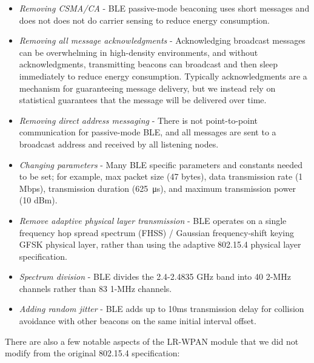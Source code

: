 \begin{itemize}

\item \textit{Removing CSMA/CA} - BLE passive-mode beaconing uses short
messages and does not does not do carrier sensing to reduce energy consumption. 

\item \textit{Removing all message acknowledgments} - Acknowledging broadcast
messages can be overwhelming in high-density environments, and without
acknowledgments, transmitting beacons can broadcast and then sleep immediately
to reduce energy consumption. Typically acknowledgments are a mechanism for
guaranteeing message delivery, but we instead rely on statistical guarantees
that the message will be delivered over time.

\item \textit{Removing direct address messaging} - There is not point-to-point
communication for passive-mode BLE, and all messages are sent to a broadcast
address and received by all listening nodes. 

\item \textit{Changing parameters} - Many BLE specific parameters and constants
needed to be set; for example, max packet size (47 bytes), data transmission
rate (1 Mbps), transmission duration (\SI{625}{\micro\second}), and maximum
transmission power (10 dBm). 

\item \textit{Remove adaptive physical layer transmission} - BLE operates on a
single frequency hop spread spectrum (FHSS) / Gaussian frequency-shift keying
GFSK physical layer, rather than using the adaptive 802.15.4 physical layer
specification.

\item \textit{Spectrum division} - BLE divides the 2.4-2.4835 GHz band into 40
2-MHz channels rather than 83 1-MHz channels.

\item \textit{Adding random jitter} - BLE adds up to 10ms transmission delay
for collision avoidance with other beacons on the same initial interval offset.

\end{itemize}

There are also a few notable aspects of the LR-WPAN module that we did not
modify from the original 802.15.4 specification:

